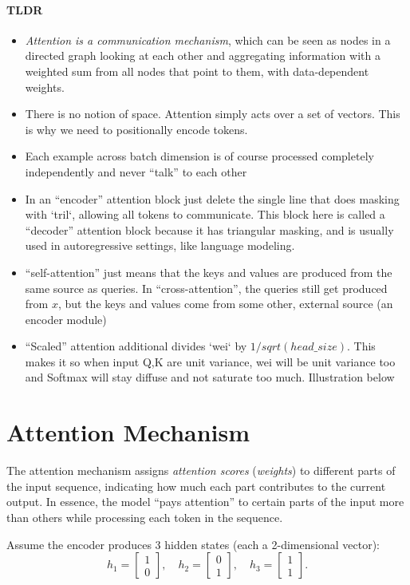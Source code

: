 \paragraph{TLDR}
\begin{itemize}
	\item \textit{Attention is a communication mechanism}, which can be seen as nodes in a directed graph looking at each other and aggregating information with a weighted sum from all nodes that point to them, with data-dependent weights.
	\item There is no notion of space. Attention simply acts over a set of vectors. This is why we need to positionally encode tokens.
	\item Each example across batch dimension is of course processed completely independently and never ``talk'' to each other
	\item In an ``encoder'' attention block just delete the single line that does masking with `tril`, allowing all tokens to communicate. This block here is called a ``decoder'' attention block because it has triangular masking, and is usually used in autoregressive settings, like language modeling.
	\item ``self-attention'' just means that the keys and values are produced from the same source as queries. In ``cross-attention'', the queries still get produced from $x$, but the keys and values come from some other, external source (\eg an encoder module)
	\item ``Scaled'' attention additional divides `wei` by $1/sqrt(head\_size)$. This makes it so when input Q,K are unit variance, wei will be unit variance too and Softmax will stay diffuse and not saturate too much. Illustration below
\end{itemize}

\section{Attention Mechanism}
\label{sec:nlp_attention}


The attention mechanism assigns \textit{attention scores} (\ie \textit{weights}) to different parts of the input sequence, indicating how much each part contributes to the current output. In essence, the model ``pays attention'' to certain parts of the input more than others while processing each token in the sequence.

Assume the encoder produces 3 hidden states (each a 2-dimensional vector):
\[
h_1 = \begin{bmatrix} 1 \\ 0 \end{bmatrix}, \quad
h_2 = \begin{bmatrix} 0 \\ 1 \end{bmatrix}, \quad
h_3 = \begin{bmatrix} 1 \\ 1 \end{bmatrix}.
\]

